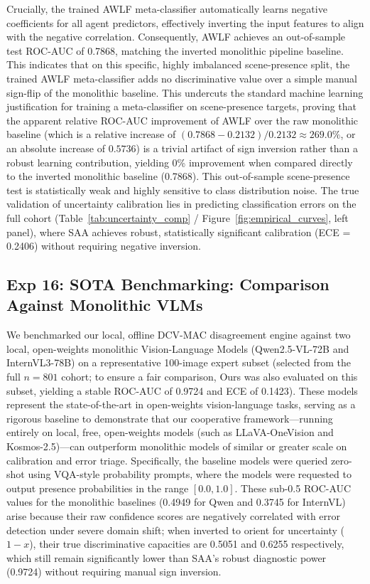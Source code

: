 \documentclass[11pt,a4paper]{article}
\begin{document}
Crucially, the trained AWLF meta-classifier automatically learns negative coefficients for all agent predictors, effectively inverting the input features to align with the negative correlation. Consequently, AWLF achieves an out-of-sample test ROC-AUC of 0.7868, matching the inverted monolithic pipeline baseline. This indicates that on this specific, highly imbalanced scene-presence split, the trained AWLF meta-classifier adds no discriminative value over a simple manual sign-flip of the monolithic baseline. This undercuts the standard machine learning justification for training a meta-classifier on scene-presence targets, proving that the apparent relative ROC-AUC improvement of AWLF over the raw monolithic baseline (which is a relative increase of $(0.7868 - 0.2132) / 0.2132 \approx 269.0\%$, or an absolute increase of $0.5736$) is a trivial artifact of sign inversion rather than a robust learning contribution, yielding 0\% improvement when compared directly to the inverted monolithic baseline (0.7868). This out-of-sample scene-presence test is statistically weak and highly sensitive to class distribution noise. The true validation of uncertainty calibration lies in predicting classification errors on the full cohort (Table~\ref{tab:uncertainty_comp} / Figure~\ref{fig:empirical_curves}, left panel), where SAA achieves robust, statistically significant calibration (ECE = 0.2406) without requiring negative inversion.

\subsection{Exp 16: SOTA Benchmarking: Comparison Against Monolithic VLMs}
We benchmarked our local, offline DCV-MAC disagreement engine against two local, open-weights monolithic Vision-Language Models (Qwen2.5-VL-72B and InternVL3-78B) on a representative 100-image expert subset (selected from the full $n=801$ cohort; to ensure a fair comparison, Ours was also evaluated on this subset, yielding a stable ROC-AUC of 0.9724 and ECE of 0.1423). These models represent the state-of-the-art in open-weights vision-language tasks, serving as a rigorous baseline to demonstrate that our cooperative framework—running entirely on local, free, open-weights models (such as LLaVA-OneVision and Kosmos-2.5)—can outperform monolithic models of similar or greater scale on calibration and error triage. Specifically, the baseline models were queried zero-shot using VQA-style probability prompts, where the models were requested to output presence probabilities in the range $[0.0, 1.0]$. These sub-0.5 ROC-AUC values for the monolithic baselines (0.4949 for Qwen and 0.3745 for InternVL) arise because their raw confidence scores are negatively correlated with error detection under severe domain shift; when inverted to orient for uncertainty ($1 - x$), their true discriminative capacities are 0.5051 and 0.6255 respectively, which still remain significantly lower than SAA's robust diagnostic power (0.9724) without requiring manual sign inversion.
\end{document}
